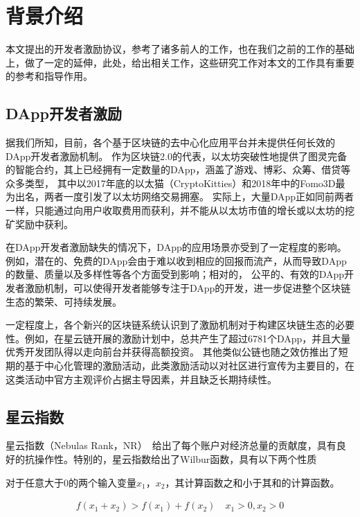 \section{背景介绍}
本文提出的开发者激励协议，参考了诸多前人的工作，也在我们之前的工作的基础上，做了一定的延伸，此处，给出相关工作，这些研究工作对本文的工作具有重要的参考和指导作用。

\subsection{DApp开发者激励}
据我们所知，目前，各个基于区块链的去中心化应用平台并未提供任何长效的DApp开发者激励机制。
作为区块链2.0的代表，以太坊突破性地提供了图灵完备的智能合约，其上已经拥有一定数量的DApp，涵盖了游戏、博彩、众筹、借贷等众多类型，
其中以2017年底的以太猫（CryptoKitties）和2018年中的Fomo3D\cite{Fomo3D}最为出名，两者一度引发了以太坊网络交易拥塞。
实际上，大量DApp正如同前两者一样，只能通过向用户收取费用而获利，并不能从以太坊市值的增长或以太坊的挖矿奖励中获利。

在DApp开发者激励缺失的情况下，DApp的应用场景亦受到了一定程度的影响。例如，潜在的、免费的DApp会由于难以收到相应的回报而流产，从而导致DApp的数量、质量以及多样性等各个方面受到影响；相对的，
公平的、有效的DApp开发者激励机制，可以使得开发者能够专注于DApp的开发，进一步促进整个区块链生态的繁荣、可持续发展。

一定程度上，各个新兴的区块链系统认识到了激励机制对于构建区块链生态的必要性。例如，在星云链开展的激励计划中，总共产生了超过6781个DApp，并且大量优秀开发团队得以走向前台并获得高额投资\cite{Nabulasincentive}。
其他类似公链也随之效仿推出了短期的基于中心化管理的激励活动，此类激励活动以对社区进行宣传为主要目的，在这类活动中官方主观评价占据主导因素，并且缺乏长期持续性。

\subsection{星云指数}
星云指数（Nebulas Rank，NR）~\cite{Nabulasyellowpaper}给出了每个账户对经济总量的贡献度，具有良好的抗操作性。特别的，星云指数给出了Wilbur函数，具有以下两个性质
\begin{property}
\label{prop:one}
对于任意大于$0$的两个输入变量$x_1$，$x_2$，其计算函数之和小于其和的计算函数。
\end{property}
\begin{align}
f(x_1+x_2)>f(x_1)+f(x_2) \quad x_1>0,x_2>0
\end{align}

